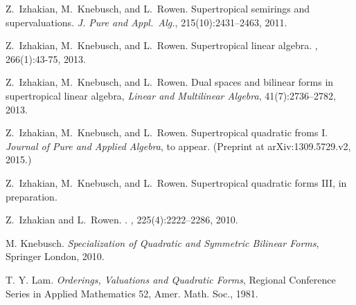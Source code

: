 \documentclass [12pt,a4paper,reqno]{amsart}
\begin{document}
\begin{thebibliography}{10} 

 Z.~Izhakian, M.~Knebusch, and L.~Rowen.
\newblock Supertropical semirings and supervaluations.
 \newblock  \emph{J. Pure and Appl.~Alg.}, 215(10):2431--2463, 2011.

Z.~Izhakian, M.~Knebusch, and L.~Rowen.
\newblock Supertropical linear algebra.
,   266(1):43-75, 2013.

  Z.~Izhakian, M.~Knebusch, and   L.~Rowen.
\newblock Dual spaces and bilinear forms in supertropical linear
algebra, {\em Linear and Multilinear Algebra}, 41(7):2736--2782, 2013.
 

Z.~Izhakian, M.~Knebusch, and L.~Rowen.
\newblock Supertropical quadratic froms I. {\em Journal of Pure and Applied Algebra}, to appear.
\newblock (Preprint at arXiv:1309.5729.v2, 2015.)

Z.~Izhakian, M.~Knebusch, and L.~Rowen.
\newblock Supertropical quadratic forms III, in preparation.

Z.~Izhakian and L.~Rowen.
.
, 225(4):2222--2286, 2010.

 M. Knebusch. \textit{Specialization of Quadratic and Symmetric Bilinear Forms}, Springer London, 2010.

  T. Y. Lam.
\textit{Orderings, Valuations and Quadratic Forms}, Regional Conference Series in Applied Mathematics 52, Amer. Math. Soc.,  1981.

 \end{thebibliography}
\end{document}
